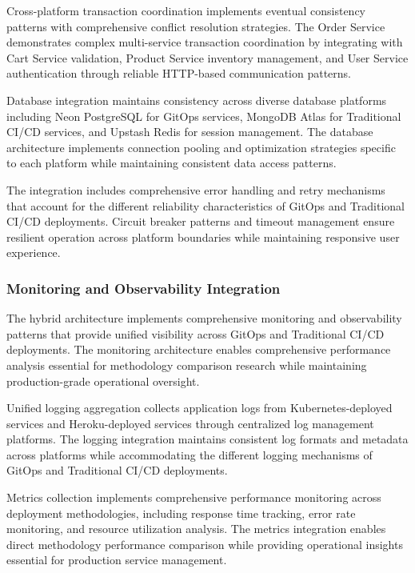 Cross-platform transaction coordination implements eventual consistency patterns with comprehensive conflict resolution strategies. The Order Service demonstrates complex multi-service transaction coordination by integrating with Cart Service validation, Product Service inventory management, and User Service authentication through reliable HTTP-based communication patterns.

Database integration maintains consistency across diverse database platforms including Neon PostgreSQL for GitOps services, MongoDB Atlas for Traditional CI/CD services, and Upstash Redis for session management. The database architecture implements connection pooling and optimization strategies specific to each platform while maintaining consistent data access patterns.

The integration includes comprehensive error handling and retry mechanisms that account for the different reliability characteristics of GitOps and Traditional CI/CD deployments. Circuit breaker patterns and timeout management ensure resilient operation across platform boundaries while maintaining responsive user experience.

\subsubsection{Monitoring and Observability Integration}

The hybrid architecture implements comprehensive monitoring and observability patterns that provide unified visibility across GitOps and Traditional CI/CD deployments. The monitoring architecture enables comprehensive performance analysis essential for methodology comparison research while maintaining production-grade operational oversight.

Unified logging aggregation collects application logs from Kubernetes-deployed services and Heroku-deployed services through centralized log management platforms. The logging integration maintains consistent log formats and metadata across platforms while accommodating the different logging mechanisms of GitOps and Traditional CI/CD deployments.

Metrics collection implements comprehensive performance monitoring across deployment methodologies, including response time tracking, error rate monitoring, and resource utilization analysis. The metrics integration enables direct methodology performance comparison while providing operational insights essential for production service management.

